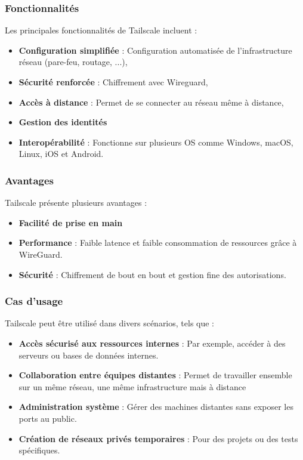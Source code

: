 \documentclass[12pt,letterpaper]{article}
\begin{document}
\subsubsection{Fonctionnalités}

Les principales fonctionnalités de Tailscale incluent :
\begin{itemize}
    \item \textbf{Configuration simplifiée} : Configuration automatisée de l'infrastructure réseau (pare-feu, routage, ...),
    \item \textbf{Sécurité renforcée} : Chiffrement avec Wireguard,
    \item \textbf{Accès à distance} : Permet de se connecter au réseau même à distance,
    \item \textbf{Gestion des identités} 
    \item \textbf{Interopérabilité} : Fonctionne sur plusieurs OS comme Windows, macOS, Linux, iOS et Android.
\end{itemize}

\subsubsection{Avantages}

Tailscale présente plusieurs avantages :
\begin{itemize}
    \item \textbf{Facilité de prise en main}
    \item \textbf{Performance} : Faible latence et faible consommation de ressources grâce à WireGuard.
    \item \textbf{Sécurité} : Chiffrement de bout en bout et gestion fine des autorisations.
\end{itemize}

\subsubsection{Cas d'usage}

Tailscale peut être utilisé dans divers scénarios, tels que :
\begin{itemize}
    \item \textbf{Accès sécurisé aux ressources internes} : Par exemple, accéder à des serveurs ou bases de données internes.
    \item \textbf{Collaboration entre équipes distantes} : Permet de travailler ensemble sur un même réseau, une même infrastructure mais à distance
    \item \textbf{Administration système} : Gérer des machines distantes sans exposer les ports au public.
    \item \textbf{Création de réseaux privés temporaires} : Pour des projets ou des tests spécifiques.
\end{itemize}
\end{document}
